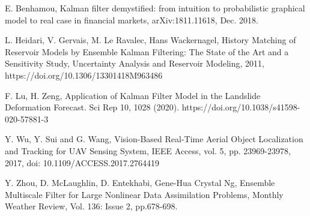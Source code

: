 \documentclass[smallcondensed]{svjour3}
\begin{document}
\begin{thebibliography}{99}
 E. Benhamou, Kalman filter demystified: from intuition to probabilistic graphical model to real case in financial markets, 	arXiv:1811.11618, Dec. 2018.

 L. Heidari,  V. Gervais,  M. Le Ravalec,  Hans Wackernagel,  History Matching of Reservoir Models by Ensemble Kalman Filtering: The State of the Art and a Sensitivity Study, Uncertainty Analysis and Reservoir Modeling, 2011, https://doi.org/10.1306/13301418M963486


F.  Lu, H.  Zeng, Application of Kalman Filter Model in the Landslide Deformation Forecast. Sci Rep 10, 1028 (2020). https://doi.org/10.1038/s41598-020-57881-3

 Y. Wu, Y. Sui and G. Wang, Vision-Based Real-Time Aerial Object Localization and Tracking for UAV Sensing System,  IEEE Access, vol. 5, pp. 23969-23978, 2017, doi: 10.1109/ACCESS.2017.2764419

 Y. Zhou, D. McLaughlin, D. Entekhabi,  Gene-Hua Crystal Ng, Ensemble Multiscale Filter for Large Nonlinear Data Assimilation Problems, Monthly Weather Review, Vol. 136: Issue 2, pp.678-698.
\end{thebibliography}
\end{document}

